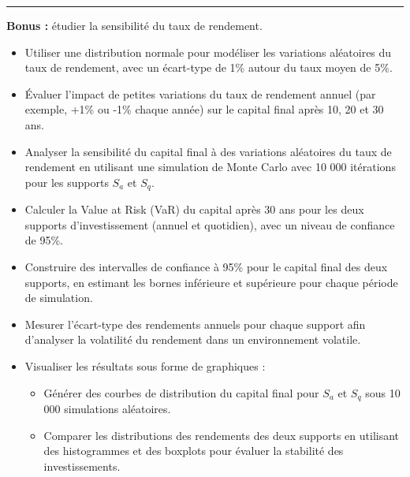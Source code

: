 \documentclass{article}
\begin{document}
\begin{center}
\rule{0.5\textwidth}{.4pt}
\end{center}

\textbf{Bonus :} étudier la sensibilité du taux de rendement.
\begin{itemize}
    \item Utiliser une distribution normale pour modéliser les variations aléatoires du taux de rendement, avec un écart-type de 1\% autour du taux moyen de 5\%.
    \item Évaluer l'impact de petites variations du taux de rendement annuel (par exemple, +1\% ou -1\% chaque année) sur le capital final après 10, 20 et 30 ans.
    \item Analyser la sensibilité du capital final à des variations aléatoires du taux de rendement en utilisant une simulation de Monte Carlo avec 10 000 itérations pour les supports $S_a$ et $S_q$.
    \item Calculer la Value at Risk (VaR) du capital après 30 ans pour les deux supports d'investissement (annuel et quotidien), avec un niveau de confiance de 95\%.
    \item Construire des intervalles de confiance à 95\% pour le capital final des deux supports, en estimant les bornes inférieure et supérieure pour chaque période de simulation.
    \item Mesurer l'écart-type des rendements annuels pour chaque support afin d'analyser la volatilité du rendement dans un environnement volatile.
    \item Visualiser les résultats sous forme de graphiques :
    \begin{itemize}
        \item Générer des courbes de distribution du capital final pour $S_a$ et $S_q$ sous 10 000 simulations aléatoires.
        \item Comparer les distributions des rendements des deux supports en utilisant des histogrammes et des boxplots pour évaluer la stabilité des investissements.
    \end{itemize}
\end{itemize}
\end{document}
